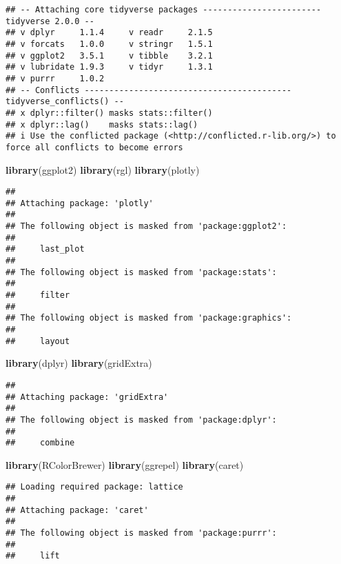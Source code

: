\documentclass[
]{article}
\newenvironment{Shaded}{\begin{snugshade}}{\end{snugshade}}
\newcommand{\FunctionTok}[1]{\textcolor[rgb]{0.13,0.29,0.53}{\textbf{#1}}}
\newcommand{\NormalTok}[1]{#1}
\begin{document}
\begin{verbatim}
## -- Attaching core tidyverse packages ------------------------ tidyverse 2.0.0 --
## v dplyr     1.1.4     v readr     2.1.5
## v forcats   1.0.0     v stringr   1.5.1
## v ggplot2   3.5.1     v tibble    3.2.1
## v lubridate 1.9.3     v tidyr     1.3.1
## v purrr     1.0.2     
## -- Conflicts ------------------------------------------ tidyverse_conflicts() --
## x dplyr::filter() masks stats::filter()
## x dplyr::lag()    masks stats::lag()
## i Use the conflicted package (<http://conflicted.r-lib.org/>) to force all conflicts to become errors
\end{verbatim}

\begin{Shaded}
\begin{Highlighting}[]
\FunctionTok{library}\NormalTok{(ggplot2)}
\FunctionTok{library}\NormalTok{(rgl)}
\FunctionTok{library}\NormalTok{(plotly)}
\end{Highlighting}
\end{Shaded}

\begin{verbatim}
## 
## Attaching package: 'plotly'
## 
## The following object is masked from 'package:ggplot2':
## 
##     last_plot
## 
## The following object is masked from 'package:stats':
## 
##     filter
## 
## The following object is masked from 'package:graphics':
## 
##     layout
\end{verbatim}

\begin{Shaded}
\begin{Highlighting}[]
\FunctionTok{library}\NormalTok{(dplyr)}
\FunctionTok{library}\NormalTok{(gridExtra)}
\end{Highlighting}
\end{Shaded}

\begin{verbatim}
## 
## Attaching package: 'gridExtra'
## 
## The following object is masked from 'package:dplyr':
## 
##     combine
\end{verbatim}

\begin{Shaded}
\begin{Highlighting}[]
\FunctionTok{library}\NormalTok{(RColorBrewer)}
\FunctionTok{library}\NormalTok{(ggrepel)}
\FunctionTok{library}\NormalTok{(caret)}
\end{Highlighting}
\end{Shaded}

\begin{verbatim}
## Loading required package: lattice
## 
## Attaching package: 'caret'
## 
## The following object is masked from 'package:purrr':
## 
##     lift
\end{verbatim}
\end{document}
